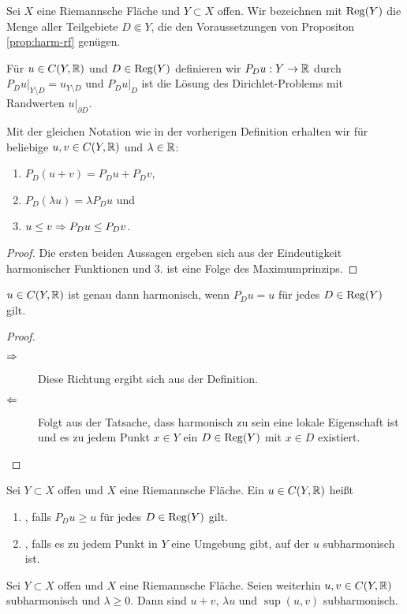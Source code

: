 \begin{defin}
  Sei $X$ eine Riemannsche Fläche und $Y \subset X$ offen. Wir
  bezeichnen mit $\operatorname{Reg}(Y)$ die Menge aller Teilgebiete $D \Subset
  Y$, die den Voraussetzungen von Propositon \ref{prop:harm-rf}
  genügen.
  
  Für $u \in C(Y, \mathbb{R})$ und $D \in \operatorname{Reg}(Y)$ definieren wir $P_D u: Y
  \rightarrow \mathbb{R}$ durch $P_D u |_{Y \setminus D} = u_{Y \setminus D}$ und
  $P_Du|_D$ ist die Lösung des Dirichlet-Problems mit Randwerten
  $u|_{\partial D}$.
\end{defin}

\begin{cor}
  \label{cor:pd-rechenregeln}
  Mit der gleichen Notation wie in der vorherigen Definition erhalten wir
  für beliebige $u, v\in C(Y, \mathbb{R})$ und $\lambda \in \mathbb{R}$:
  \begin{enumerate}
  \item $P_D(u+v) = P_Du + P_D v$,
  \item $P_D(\lambda u) = \lambda P_D u$ und
  \item $u \leq v \Rightarrow P_Du \leq P_D v$.
  \end{enumerate}
\end{cor}

\begin{proof}
  Die ersten beiden Aussagen ergeben sich aus der Eindeutigkeit
  harmonischer Funktionen und 3. ist eine Folge des Maximumprinzips.
\end{proof}

\begin{cor}
  $u \in C(Y, \mathbb{R})$ ist genau dann harmonisch, wenn $P_Du = u $ für
  jedes $D \in \operatorname{Reg}(Y)$ gilt.
\end{cor}

\begin{proof}
  \begin{description}
  \item[$\Rightarrow$] Diese Richtung ergibt sich aus der Definition.
  \item[$\Leftarrow$] Folgt aus der Tatsache, dass harmonisch zu sein eine
    lokale Eigenschaft ist und es zu jedem Punkt $x \in Y$ ein $D \in
    \operatorname{Reg}(Y)$ mit $x \in D$ existiert.
  \end{description}
\end{proof}

\begin{defin}
  Sei $Y \subset X$ offen und $X$ eine Riemannsche Fläche.
  Ein $u \in C(Y, \mathbb{R})$ heißt
  \begin{enumerate}
  \item {}, falls $P_D u \geq u$ für jedes $D \in
    \operatorname{Reg}(Y)$ gilt.
  \item {}, falls es zu jedem Punkt in $Y$
    eine Umgebung gibt, auf der $u$ subharmonisch ist.
  \end{enumerate}
\end{defin}
\begin{cor}
  Sei $Y \subset X$ offen und $X$ eine Riemannsche Fläche. Seien
  weiterhin $u,v \in C(Y, \mathbb{R})$ subharmonisch und $\lambda \geq
  0$. Dann sind $u+v$, $\lambda u$ und $\sup(u,v)$ subharmonisch.
\end{cor}

